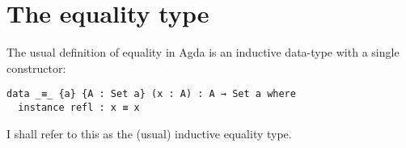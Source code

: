 \section{The equality type}
The usual definition of equality in Agda is an inductive data-type with a single
constructor:
%
\begin{verbatim}
data _≡_ {a} {A : Set a} (x : A) : A → Set a where
  instance refl : x ≡ x
\end{verbatim}
%
I shall refer to this as the (usual) inductive equality type.
